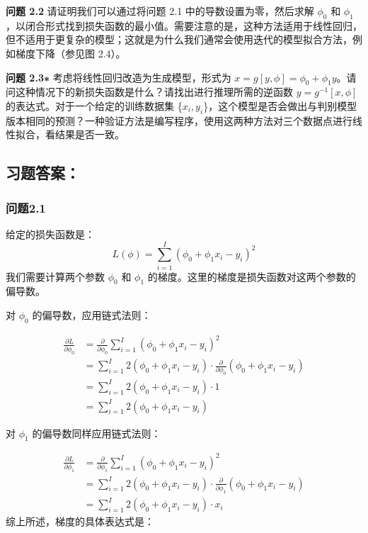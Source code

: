 \documentclass[
]{article}
\begin{document}
\textbf{问题 2.2} 请证明我们可以通过将问题 2.1
中的导数设置为零，然后求解 \(\phi_0\) 和
\(\phi_1\)，以闭合形式找到损失函数的最小值。需要注意的是，这种方法适用于线性回归，但不适用于更复杂的模型；这就是为什么我们通常会使用迭代的模型拟合方法，例如梯度下降（参见图
2.4）。

\textbf{问题 2.3∗} 考虑将线性回归改造为生成模型，形式为
\(x = g[y, \phi] = \phi_0 + \phi_1 y\)。请问这种情况下的新损失函数是什么？请找出进行推理所需的逆函数
\(y = g^{-1}[x, \phi]\) 的表达式。对于一个给定的训练数据集
\{\({x_i,y_i}\)\}，这个模型是否会做出与判别模型版本相同的预测？一种验证方法是编写程序，使用这两种方法对三个数据点进行线性拟合，看结果是否一致。

\hypertarget{ux4e60ux9898ux7b54ux6848}{%
\subsection{习题答案：}\label{ux4e60ux9898ux7b54ux6848}}

\hypertarget{ux95eeux98982.1}{%
\subsubsection{问题2.1}\label{ux95eeux98982.1}}

给定的损失函数是： \[ 
L(\phi) = \sum_{i=1}^{I} (\phi_0 + \phi_1 x_i - y_i)^2 
\] 我们需要计算两个参数 \(\phi_0\) 和 \(\phi_1\)
的梯度。这里的梯度是损失函数对这两个参数的偏导数。

对 \(\phi_0\) 的偏导数，应用链式法则：

\[
\begin{aligned}
\frac{\partial L}{\partial \phi_0} &= \frac{\partial}{\partial \phi_0} \sum_{i=1}^{I} (\phi_0 + \phi_1 x_i - y_i)^2 \\
&= \sum_{i=1}^{I} 2(\phi_0 + \phi_1 x_i - y_i) \cdot \frac{\partial}{\partial \phi_0} (\phi_0 + \phi_1 x_i - y_i) \\
&= \sum_{i=1}^{I} 2(\phi_0 + \phi_1 x_i - y_i) \cdot 1 \\
&= \sum_{i=1}^{I} 2(\phi_0 + \phi_1 x_i - y_i)
\end{aligned}
\]

对 \(\phi_1\) 的偏导数同样应用链式法则：

\[
\begin{aligned}
\frac{\partial L}{\partial \phi_1} &= \frac{\partial}{\partial \phi_1} \sum_{i=1}^{I} (\phi_0 + \phi_1 x_i - y_i)^2 \\
&= \sum_{i=1}^{I} 2(\phi_0 + \phi_1 x_i - y_i) \cdot \frac{\partial}{\partial \phi_1} (\phi_0 + \phi_1 x_i - y_i) \\
&= \sum_{i=1}^{I} 2(\phi_0 + \phi_1 x_i - y_i) \cdot x_i
\end{aligned}
\] 综上所述，梯度的具体表达式是：
\end{document}
